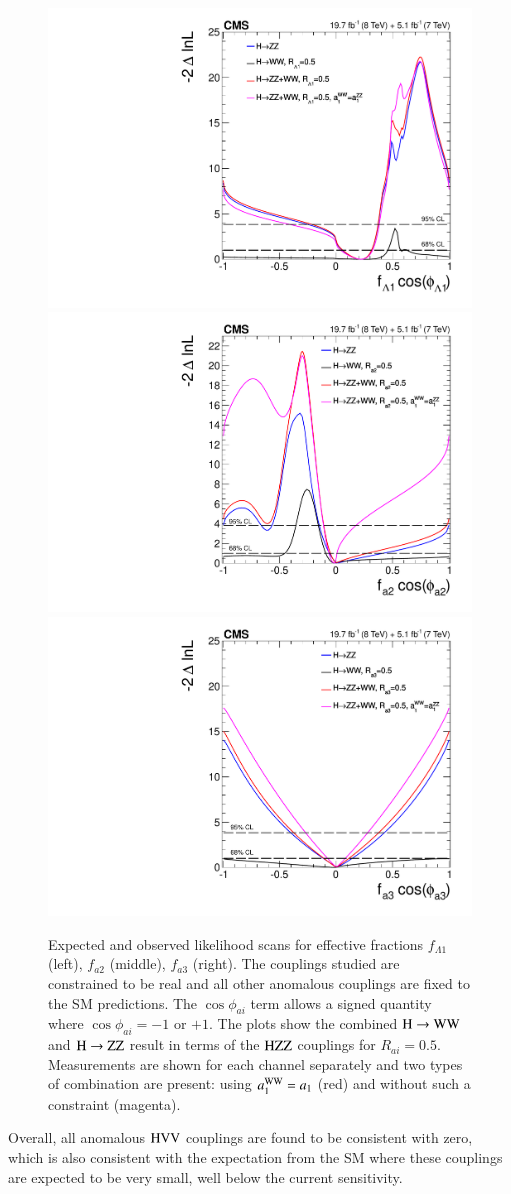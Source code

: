 \begin{figure}[!htbp]
  \begin{center} 
    \includegraphics[width=0.31\linewidth]{figures/flambda1_combine_ww.pdf}
    \includegraphics[width=0.31\linewidth]{figures/fa2_combine_ww.pdf}
    \includegraphics[width=0.31\linewidth]{figures/fa3_combine_ww.pdf}
    \caption{
      Expected and observed likelihood scans for effective fractions 
      $f_{\Lambda1}$ (left), $f_{a2}$ (middle), $f_{a3}$ (right). 
      The couplings studied are constrained to be real and all other anomalous couplings are fixed to the SM predictions. 
      The $\cos\phi_{ai}$ term allows a signed quantity where $\cos\phi_{ai}=-1$ or $+1$.
      The plots show the combined  $\mathrm{H}\to\mathrm{W}\mathrm{W}$ and $\mathrm{H}\to\mathrm{Z}\mathrm{Z}$ result in terms of the $\mathrm{H}\mathrm{Z}\mathrm{Z}$ couplings for $R_{ai} = 0.5$. 
      Measurements are shown for each channel separately and two types of combination are present:
      using $a_1^{\mathrm{W}\mathrm{W}} = a_1$ (red) and without such a constraint (magenta).
    \label{fig:hwwscans}
    }
  \end{center}
\end{figure}

%
Overall, all anomalous $\mathrm{H}\mathrm{V}\mathrm{V}$ couplings are found to be consistent
with zero, which is also consistent with the expectation from the SM
where these couplings are expected to be very small, well below the
current sensitivity.
